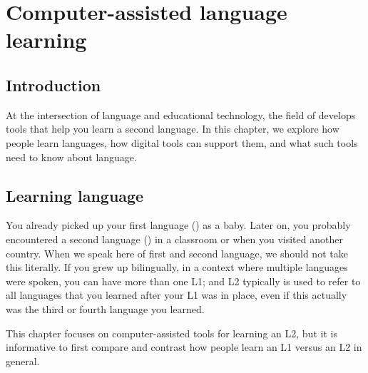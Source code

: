 
\chapter{Computer-assisted language learning}
\label{ch:call}

%
% 


\section{Introduction}

At the intersection of language and educational technology, the field
of  develops tools
that help you learn a second language.  In this chapter, we explore how people learn
languages, how digital tools can support them, and what such tools
need to know about language.

\section{Learning language}

You already picked up your first language () as a baby.
Later on, you probably encountered a second language () in
a classroom or when you visited another country.  When we speak here
of first and second language, we should not take this literally. If
you grew up bilingually, in a context where multiple languages were
spoken, you can have more than one L1; and L2 typically is used to
refer to all languages that you learned after your L1
was in place, even if this actually was the third or fourth language
you learned.

This chapter focuses on computer-assisted tools for learning an L2,
but it is informative to first compare and contrast how people learn an L1 versus an L2 in general.

